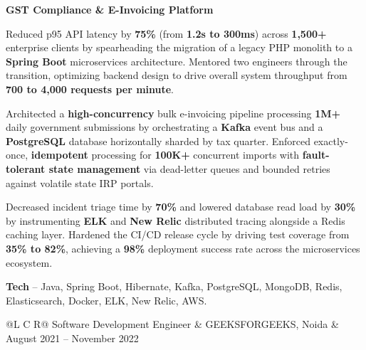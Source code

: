 \textcolor{Project}{\textbf{GST Compliance \& E-Invoicing Platform}}
\vspace{-0.88ex}
\begin{zitemize}
    \item Reduced p95 API latency by \textbf{75\%} (from \textbf{1.2s to 300ms}) across \textbf{1,500+} enterprise clients by spearheading the migration of a legacy PHP monolith to a \textbf{Spring Boot} microservices architecture. Mentored two engineers through the transition, optimizing backend design to drive overall system throughput from \textbf{700 to 4,000 requests per minute}.
    \item Architected a \textbf{high-concurrency} bulk e-invoicing pipeline processing \textbf{1M+} daily government submissions by orchestrating a \textbf{Kafka} event bus and a \textbf{PostgreSQL} database horizontally sharded by tax quarter. Enforced exactly-once, \textbf{idempotent} processing for \textbf{100K+} concurrent imports with \textbf{fault-tolerant state management} via dead-letter queues and bounded retries against volatile state IRP portals.
    \item Decreased incident triage time by \textbf{70\%} and lowered database read load by \textbf{30\%} by instrumenting \textbf{ELK} and \textbf{New Relic} distributed tracing alongside a Redis caching layer. Hardened the CI/CD release cycle by driving test coverage from \textbf{35\% to 82\%}, achieving a \textbf{98\%} deployment success rate across the microservices ecosystem.
    \item \textbf{Tech} -- Java, Spring Boot, Hibernate, Kafka, PostgreSQL, MongoDB, Redis, Elasticsearch, Docker, ELK, New Relic, AWS.
\end{zitemize}

\noindent
\begin{tabularx}{\textwidth}{@{}L C R@{}}
\textcolor{role}{Software Development Engineer} & \textcolor{company}{GEEKSFORGEEKS, Noida} & \textcolor{date}{August 2021 -- November 2022}\\
\end{tabularx}
\vspace{-1.6ex}

